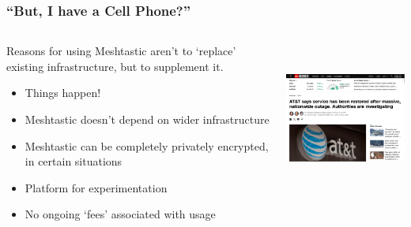 \documentclass[aspectratio=169]{beamer}
\begin{document}
\begin{frame}[fragile]
  \frametitle{``But, I have a Cell Phone?''}
  \begin{columns}[]
    \begin{column}[T]{0.45\paperwidth}
      Reasons for using Meshtastic aren't to `replace' existing infrastructure, but to supplement it.
      \begin{itemize}%
        \item{Things happen!}
        \item{Meshtastic doesn't depend on wider infrastructure}
        \item{Meshtastic can be completely privately encrypted, in certain situations}
        \item{Platform for experimentation}
        \item{No ongoing `fees' associated with usage}
     \end{itemize}
    \end{column}
    \begin{column}[T]{0.45\paperwidth}
      \includegraphics[height=5cm,keepaspectratio]{images/att.png}
    \end{column}
  \end{columns}
\end{frame}
\end{document}
